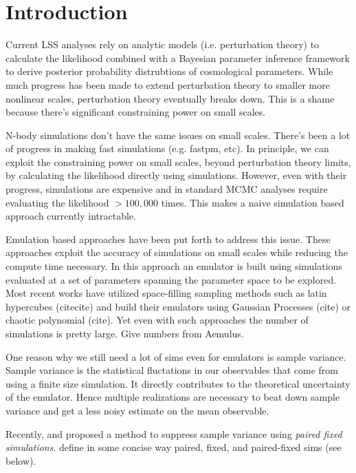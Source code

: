 \section{Introduction} \label{sec:intro} 

Current LSS analyses rely on analytic models (i.e. perturbation theory) to calculate 
the likelihood combined with a Bayesian parameter inference framework to derive 
posterior probability distrubtions of cosmological parameters. While much progress 
has been made to extend perturbation theory to smaller more nonlinear scales, 
perturbation theory eventually breaks down. This is a shame because there's significant 
constraining power on small scales. 

N-body simulations don't have the same issues on small scales. There's been a lot of 
progress in making fast simulations (e.g. fastpm, etc). In principle, we can exploit
the constraining power on small scales, beyond perturbation theory limits, by calculating 
the likelihood directly using simulations. However, even with their progress, simulations 
are expensive and in standard MCMC analyses require evaluating the likelihood $>100,000$ 
times. This makes a naive simulation based approach currently intractable. 

Emulation based approaches have been put forth to address this issue. These approaches 
exploit the accuracy of simulations on small scales while reducing the compute time 
necessary. In this approach an emulator is built using simulations evaluated at a set 
of parameters spanning the parameter space to be explored. Most recent works have 
utilized space-filling sampling methods such as latin hypercubes (citecite) and build
their emulators using Gaussian Processes (cite) or chaotic polynomial (cite). Yet even 
with such approaches the number of simulations is pretty large. Give numbers from Aemulus. 

    
One reason why we still need a lot of sims even for emulators is sample variance. Sample
variance is the statistical fluctations in our observables that come from using a finite 
size simulation. It directly contributes to the theoretical uncertainty of the emulator. 
Hence multiple realizations are necessary to beat down sample variance and get a less 
noisy estimate on the mean observable. 

Recently, \cite{pontzen2016} and \cite{angulo2016} proposed a method to suppress sample
variance using \emph{paired fixed simulations}. define in some concise way paired, fixed, 
and paired-fixed sims (see below). 

